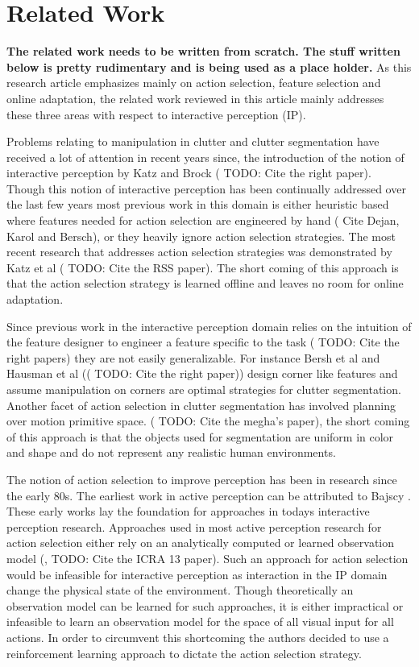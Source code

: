 \section{Related Work}
\label{sec:rel_work}
{\bf The related work needs to be written from scratch. The stuff written below is pretty rudimentary and is being used as a place holder.} As this research article emphasizes mainly on action selection, feature selection and online adaptation, the related work reviewed in this article mainly addresses these three areas with respect to interactive perception (IP). 

Problems relating to manipulation in clutter and clutter segmentation have received a lot of attention in recent years since, the introduction of the notion of interactive perception by Katz and Brock (\cite{pito99_nbv} TODO: Cite the right paper). Though this notion of interactive perception has been continually addressed over the last few years most previous work in this domain is either heuristic based where features needed for action selection are engineered by hand (\cite{golovin11_adaptive} Cite Dejan, Karol and Bersch), or they heavily ignore action selection strategies. The most recent research that addresses action selection strategies was demonstrated by Katz et al (\cite{pito99_nbv} TODO: Cite the RSS paper). The short coming of this approach is that the action selection strategy is learned offline and leaves no room for online adaptation. 

Since previous work in the interactive perception domain relies on the intuition of the feature designer to engineer a feature specific to the task (\cite{pito99_nbv} TODO: Cite the right papers) they are not easily generalizable. For instance Bersh et al and Hausman et al  ((\cite{pito99_nbv} TODO: Cite the right paper)) design corner like features and assume manipulation on corners are optimal strategies for clutter segmentation. Another facet of action selection in clutter segmentation has involved planning over motion primitive space. (\cite{pito99_nbv} TODO: Cite the megha's paper), the short coming of this approach is that the objects used for segmentation are uniform in color and shape and do not represent any realistic human environments. 

The notion of action selection to improve perception has been in research since the early 80s. The earliest work in active perception can be attributed to Bajscy \cite{bajscy_88, Krotkov_93}. These early works lay the foundation for approaches in todays interactive perception research. Approaches used in most active perception research for action selection either rely on an analytically computed or learned observation model (\cite{Scharinger10_SceneModeling6D}, \cite{pito99_nbv} TODO: Cite the ICRA 13 paper). Such an approach for action selection would be infeasible for interactive perception as interaction in the IP domain change the physical state of the environment. Though theoretically an observation model can be learned for such approaches, it is either impractical or infeasible to learn an observation model for the space of all visual input for all actions. In order to circumvent this shortcoming the authors decided to use a reinforcement learning approach to dictate the action selection strategy. 

